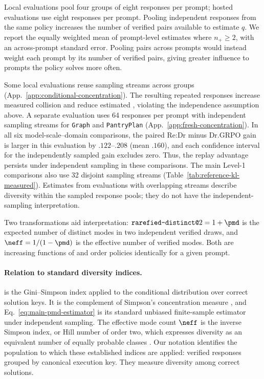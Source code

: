 Local evaluations pool four groups of eight responses per prompt; hosted
evaluations use eight responses per prompt. Pooling independent responses
from the same policy increases the number of verified pairs available to
estimate $q$. We report the equally weighted mean of prompt-level estimates
where $n_+\ge2$, with an across-prompt standard error. Pooling pairs across
prompts would instead weight each prompt by its number of verified pairs,
giving greater influence to prompts the policy solves more often.

Some local evaluations reuse sampling streams across groups
(App.~\ref{app:conditional-concentration}). The resulting repeated responses
increase measured collision and reduce estimated \pmd{}, violating the
independence assumption above. A separate evaluation uses 64 responses per
prompt with independent sampling streams for \texttt{Graph} and
\texttt{PantryPlan} (App.~\ref{app:fresh-concentration}). In all six
model-scale--domain comparisons, the paired Re:Dr minus Dr.GRPO \pmd{}
gain is larger in this evaluation by $.122$--$.208$ (mean $.160$), and each
confidence interval for the independently sampled gain excludes zero. Thus,
the replay advantage persists under independent sampling in these comparisons.
The main Level-1 comparisons also use 32 disjoint sampling streams
(Table~\ref{tab:reference-kl-measured}). Estimates from evaluations with
overlapping streams describe diversity within the sampled response pools;
they do not have the independent-sampling interpretation.

Two transformations aid interpretation: $\texttt{rarefied-distinct@}2=1+\pmd$
is the expected number of distinct modes in two independent verified draws,
and $\neff=1/(1-\pmd)$ is the effective number of verified modes. Both are
increasing functions of \pmd{} and order policies identically for a given prompt.

\paragraph{Relation to standard diversity indices.}
\pmd{} is the Gini--Simpson index applied to the conditional distribution
over correct solution keys. It is the complement of Simpson's concentration
measure \citep{simpson1949measurement}, and
Eq.~\eqref{eq:main-pmd-estimator} is its standard unbiased finite-sample
estimator under independent sampling. The effective mode count $\neff$ is
the inverse Simpson index, or Hill number of order two, which expresses
diversity as an equivalent number of equally probable classes
\citep{hill1973diversity,jost2006entropy}. Our notation identifies the
population to which these established indices are applied: verified
responses grouped by canonical execution key. They measure diversity among
correct solutions.


